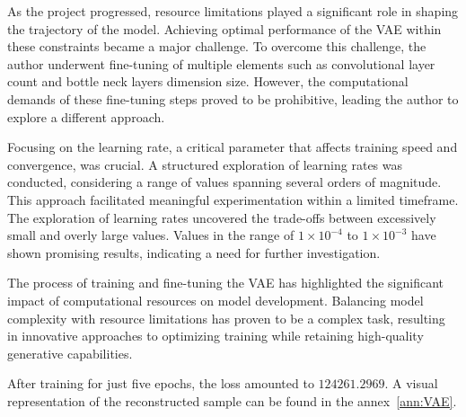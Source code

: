 As the project progressed, resource limitations played a significant role in shaping the trajectory of the model. Achieving optimal performance of the \ac{VAE} within these constraints became a major challenge. To overcome this challenge, the author underwent fine-tuning of multiple elements such as convolutional layer count and bottle neck layers dimension size. However, the computational demands of these fine-tuning steps proved to be prohibitive, leading the author to explore a different approach.

Focusing on the learning rate, a critical parameter that affects training speed and convergence, was crucial. A structured exploration of learning rates was conducted, considering a range of values spanning several orders of magnitude. This approach facilitated meaningful experimentation within a limited timeframe. The exploration of learning rates uncovered the trade-offs between excessively small and overly large values. Values in the range of $1 \times 10^{-4}$ to $1 \times 10^{-3}$ have shown promising results, indicating a need for further investigation.

The process of training and fine-tuning the \ac{VAE} has highlighted the significant impact of computational resources on model development. Balancing model complexity with resource limitations has proven to be a complex task, resulting in innovative approaches to optimizing training while retaining high-quality generative capabilities.

After training for just five epochs, the loss amounted to $124261.2969$. A visual representation of the reconstructed sample can be found in the annex~\ref{ann:VAE}.